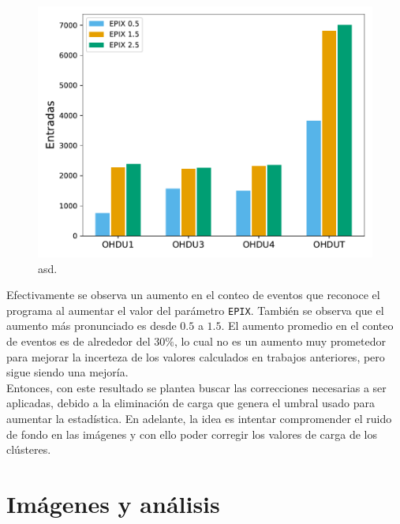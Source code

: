 \begin{figure}[H]
    \centering
    \includegraphics[scale=0.4]{Figs/Entradas_vs_Epix.pdf}
    \caption{\footnotesize{asd.}}
    \label{fig:EntradasVsEpix}
\end{figure}
Efectivamente se observa un aumento en el conteo de eventos que reconoce el programa al aumentar el valor del parámetro \verb|EPIX|. También se observa que el aumento más pronunciado es desde $0.5$ a $1.5$. El aumento promedio en el conteo de eventos es de alrededor del $30\%$, lo cual no es un aumento muy prometedor para mejorar la incerteza de los valores calculados en trabajos anteriores, pero sigue siendo una mejoría.\\
\indent Entonces, con este resultado se plantea buscar las correcciones necesarias a ser aplicadas, debido a la eliminación de carga que genera el umbral usado para aumentar la estadística. En adelante, la idea es intentar compromender el ruido de fondo en las imágenes y con ello poder corregir los valores de carga de los clústeres.


\chapter{Imágenes y análisis}
